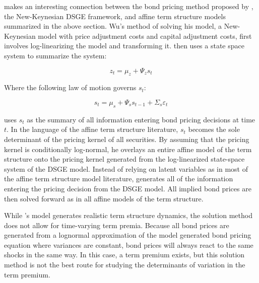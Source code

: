 \documentclass{article}
\numberwithin{equation}{section}
\begin{document}
\citet{wu2006} makes an interesting connection between the bond pricing method
proposed by \citet{jermann1998}, the New-Keynesian DSGE framework, and affine
term structure models summarized in the above section. Wu's method of solving
his model, a New-Keynesian model with price adjustment costs and capital
adjustment costs, first involves log-linearizing the model and transforming it.
\citeauthor{wu2006} then uses a state space system to summarize the system:

\begin{equation}
    z_t=\mu_z+\Psi_zs_t
    \label{eq4}
\end{equation}

Where the following law of motion governs $s_t$:

\begin{equation}
    s_t=\mu_s+\Psi_ss_{t-1}+\Sigma_s\varepsilon_t
    \label{eq5}
\end{equation}

\citeauthor{wu2006} uses $s_t$ as the summary of all information entering bond
pricing decisions at time $t$. In the language of the affine term structure
literature, $s_t$ becomes the sole determinant of the pricing kernel of all
securities. By assuming that the pricing kernel is conditionally log-normal,
he overlays an entire affine model of the term structure onto the pricing kernel
generated from the log-linearized state-space system of the DSGE model. Instead
of relying on latent variables as in most of the affine term structure model
literature, \citeauthor{wu2006} generates all of the information entering the
pricing decision from the DSGE model. All implied bond prices are then solved
forward as in all affine models of the term structure.

While \citeauthor{wu2006}'s model generates realistic term structure dynamics,
the solution method does not allow for time-varying term premia. Because all
bond prices are generated from a lognormal approximation of the model generated
bond pricing equation where variances are constant, bond prices will always
react to the same shocks in the same way. In this case, a term premium exists,
but this solution method is not the best route for studying the determinants of
variation in the term premium.
\end{document}
